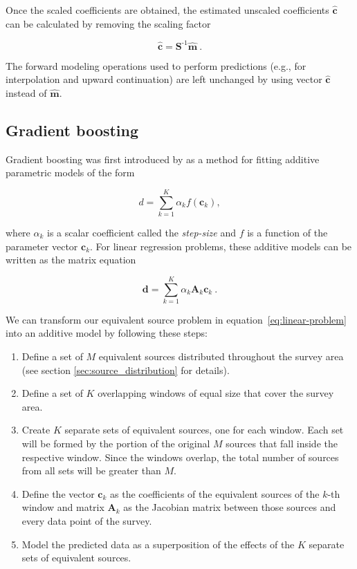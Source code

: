 \documentclass[twocolumn]{article}
\newcommand{\inv}{^{\text{-}1}}
\begin{document}
Once the scaled coefficients are obtained, the estimated unscaled coefficients
$\hat{\mathbf{c}}$ can be calculated by removing the scaling factor

\begin{equation}
    \hat{\mathbf{c}} = \mathbf{S}\inv \hat{\mathbf{m}} \ .
\end{equation}

\noindent The forward modeling operations used to perform predictions
(e.g., for interpolation and upward continuation) are left unchanged by
using vector $\hat{\mathbf{c}}$ instead of $\hat{\mathbf{m}}$.


\subsection{Gradient boosting}

Gradient boosting was first introduced by \citet{friedman2001, friedman2002} as
a method for fitting additive parametric models of the form

\begin{equation}
  d = \sum_{k=1}^K \alpha_k f(\mathbf{c}_k),
\end{equation}

\noindent where $\alpha_k$ is a scalar coefficient called the \emph{step-size}
and $f$ is a function of the parameter vector $\mathbf{c}_k$.
For linear regression problems, these additive models can be written as the
matrix equation

\begin{equation}
    \mathbf{d} = \sum_{k=1}^K \alpha_k \mathbf{A}_k \mathbf{c}_k \ .
    \label{eq:gb-linear-model}
\end{equation}

We can transform our equivalent source problem in
equation~\ref{eq:linear-problem} into an additive model by following these
steps:

\begin{enumerate}
  \item Define a set of $M$ equivalent sources distributed throughout the
    survey area (see section \ref{sec:source_distribution} for details).
  \item Define a set of $K$ overlapping windows of equal size that cover the
    survey area.
  \item Create $K$ separate sets of equivalent sources, one for each window.
    Each set will be formed by the portion of the original $M$ sources that fall inside
    the respective window.
    Since the windows overlap, the total number of sources
    from all sets will be greater than $M$.
  \item Define the vector $\mathbf{c}_k$ as the coefficients of the equivalent
    sources of the $k$-th window and matrix $\mathbf{A}_k$ as the Jacobian
    matrix between those sources and every data point of the survey.
  \item Model the predicted data as a superposition of the effects of the $K$
    separate sets of equivalent sources.
\end{enumerate}
\end{document}
